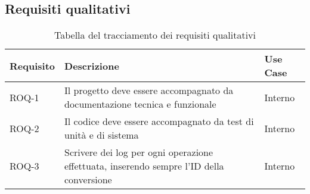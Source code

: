 \subsection{Requisiti qualitativi}
\begin{table}[H]
    \caption{Tabella del tracciamento dei requisiti qualitativi}
    \label{tab:requisiti-qualitativi}
    \begin{tabularx}{\textwidth}{lXl}
        \hline\hline
        \textbf{Requisito}                  & \textbf{Descrizione}                    & \textbf{Use Case} \\
        \hline
        ROQ-1                               & Il progetto deve essere accompagnato da
        documentazione tecnica e funzionale & Interno                                                     \\
        \hline
        ROQ-2                               & Il codice deve essere accompagnato
        da test di unità e di sistema       & Interno
        \\
        \hline
        ROQ-3                               & Scrivere dei log per ogni
        operazione effettuata, inserendo sempre l'ID della conversione
                                            & Interno
        \\
        \hline
    \end{tabularx}
\end{table}

